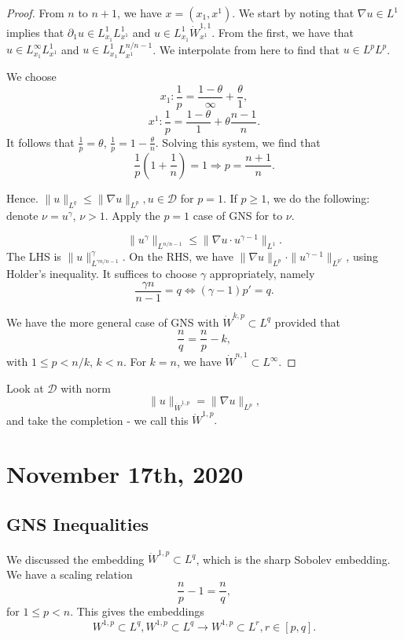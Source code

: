 \documentclass[12pt]{scrartcl}
\begin{document}
\begin{proof}
From $n$ to $n+1$, we have $x = (x_1, x^1)$.  We start by noting that $\nabla u \in L^1$ implies that $\partial_1 u \in L_{x_1}^1 L_{x^1}^1$ and $u \in L_{x_1}^1 \dot{W}_{x^1}^{1, 1}.$  From the first, we have that $u \in L_{x_1}^{\infty} L_{x^1}^1$ and $u \in L_{x_1}^1 L_{x^1}^{n/n-1}$.  We interpolate from here to find that $u \in L^p L^p$.  

We choose 
$$x_1: \frac{1}{p} = \frac{1 - \theta}{\infty} + \frac{\theta}{1},$$
$$x^1: \frac{1}{p} = \frac{1 - \theta}{1} + \theta \frac{n-1}{n}.$$
It follows that $\frac{1}{p} = \theta$, $\frac{1}{p} = 1 - \frac{\theta}{n}$.  Solving this system, we find that 
$$\frac{1}{p}\left (1 + \frac{1}{n}\right) = 1 \Longrightarrow p = \frac{n+1}{n}. $$

Hence. $\|u\|_{L^q} \le \|\nabla u \|_{L^p}, u \in \mathcal D$ for $p = 1$.  If $p \ge 1$, we do the following: denote $\nu = u^{\gamma}$, $\nu > 1$.  Apply the $p=1$ case of GNS for to $\nu$.

$$\|u^{\gamma} \|_{L^{n/n-1}} \le \|\nabla u \cdot u^{\gamma - 1} \|_{L^1}.$$
The LHS is $\|u\|_{L^{\gamma n/n-1}}^{\gamma}$.  On the RHS, we have $\|\nabla u\|_{L^p} \cdot \|u^{\gamma-1}\|_{L^{p'}}$, using Holder's inequality. 
 It suffices to choose $\gamma$ appropriately, namely
$$\frac{\gamma n}{n-1} = q \Leftrightarrow (\gamma - 1) p' = q.$$

We have the more general case of GNS with $\dot{W}^{k, p} \subset L^q$ provided that 
$$\frac{n}{q} = \frac{n}{p} - k,$$
with $1 \le p < n/k$, $k < n$.  For $k = n$, we have $\dot{W}^{n, 1} \subset L^{\infty}$.  
\end{proof}


Look at $\mathcal D$ with norm
$$\|u\|_{\dot{W}^{1, p}} = \| \nabla u \|_{L^p},$$
and take the completion - we call this $\dot{W}^{1,p}.$ 

\pagebreak
\section{November 17th, 2020}
\subsection{GNS Inequalities}
We discussed the embedding $\dot{W}^{1, p} \subset L^q$, which is the sharp Sobolev embedding.  We have a scaling relation $$\frac{n}{p} - 1 = \frac{n}{q},$$
for $1 \le p < n$.  This gives the embeddings
$$W^{1, p} \subset L^q, W^{1, p} \subset L^q \rightarrow W^{1, p} \subset L^r, r \in [p, q].$$
\end{document}

